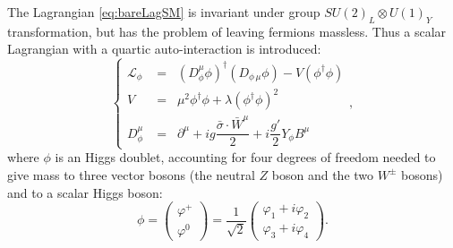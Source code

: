 The Lagrangian \ref{eq:bareLagSM} is invariant under group 
$SU(2)_{L} \otimes U(1)_{Y}$ transformation, but has the 
problem of leaving fermions massless. Thus a scalar 
Lagrangian with a quartic auto-interaction is introduced:
\begin{equation}\label{eq:lagScalar}
\left \{ \begin{array}{cl}
\mathcal{L}_{\phi} &=\;\;  (D_{\phi}^{\mu} \phi)^{\dag}(D_{\phi\,\mu} \phi) - V(\phi^{\dag}\phi)\\
V &=\;\; \mu^{2}\phi^{\dag}\phi + \lambda(\phi^{\dag}\phi)^{2}\\
D_{\phi}^{\mu} &=\;\; \partial^{\mu} + ig\dfrac{\bar{\sigma}\cdot\bar{W}^{\mu}}{2} + i\dfrac{g'}{2}Y_{\phi}B^{\mu}
\end{array}\right. ,
\end{equation}
where $\phi$ is an Higgs doublet, accounting for four 
degrees of freedom needed to give mass to three vector
bosons (the neutral $Z$ boson and the two $W^{\pm}$ bosons)
and to a scalar Higgs boson:
\begin{equation}\label{eq:higgsDoub}
\phi = \begin{pmatrix} \varphi^{+}\\\varphi^{0}
\end{pmatrix} =
\dfrac{1}{\sqrt{2}} 
\begin{pmatrix} \varphi_{1}+i\varphi_{2}\\ \varphi_{3}+i\varphi_{4}\end{pmatrix}.
\end{equation}

